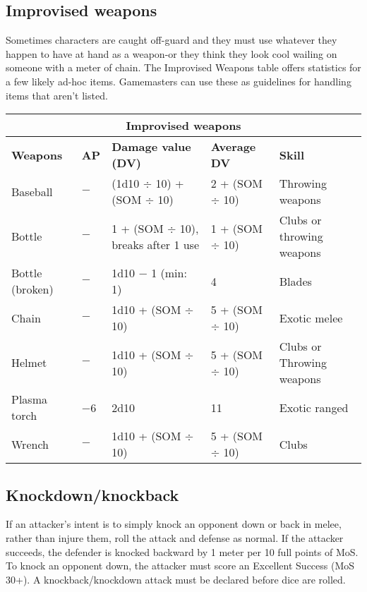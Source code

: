 \subsection{Improvised weapons}
\label{sec:improvised-weapons}

Sometimes characters are caught off-guard and they must use whatever they happen to have at hand as a weapon-or they think they look cool wailing on someone with a meter of chain. The Improvised Weapons table offers statistics for a few likely ad-hoc items. Gamemasters can use these as guidelines for handling items that aren’t listed.

\begin{table}
\begin{tabularx}{\textwidth}{|l|l|l|l|X|}
\hline
\multicolumn{5}{|c|}{\textbf{Improvised weapons}} \\
\hline
\textbf{Weapons}	& \textbf{AP}	& \textbf{Damage value (DV)}				& \textbf{Average DV}	& \textbf{Skill}			\\
\hline
Baseball			& $-$		& (1d10 $\div$ 10) + (SOM $\div$ 10)		& 2 + (SOM $\div$ 10)	& Throwing weapons			\\
\hline
Bottle			& $-$		& 1 + (SOM $\div$ 10), breaks after 1 use	& 1 + (SOM $\div$ 10)	& Clubs or throwing weapons	\\
\hline
Bottle (broken)	& $-$		& 1d10 $-$ 1 (min: 1)						& 4					& Blades					\\
\hline
Chain			& $-$		& 1d10 + (SOM $\div$ 10)					& 5 + (SOM $\div$ 10)	& Exotic melee				\\
\hline
Helmet			& $-$		& 1d10 + (SOM $\div$ 10)					& 5 + (SOM $\div$ 10)	& Clubs or Throwing weapons	\\
\hline
Plasma torch		& $-$6		& 2d10								& 11					& Exotic ranged			\\
\hline
Wrench			& $-$ 		& 1d10 + (SOM $\div$ 10)					& 5 + (SOM $\div$ 10)	& Clubs					\\
\hline
\end{tabularx}
\label{tab:improvised-weapons}
\end{table}


\subsection{Knockdown/knockback}
\label{sec:knockdown-knockback}

If an attacker’s intent is to simply knock an opponent down or back in melee, rather than injure them, roll the attack and defense as normal. If the attacker succeeds, the defender is knocked backward by 1 meter per 10 full points of MoS. To knock an opponent down, the attacker must score an Excellent Success (MoS 30+). A knockback/knockdown attack must be declared before dice are rolled.

